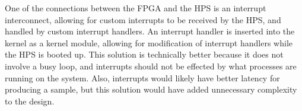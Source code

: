 \documentclass{subfile}
\begin{document}
  One of the connections between the FPGA and the HPS is an interrupt interconnect, 
  allowing for custom interrupts to be received by the HPS, and handled by custom interrupt handlers. 
  An interrupt handler is inserted into the kernel as a kernel module, allowing 
  for modification of interrupt handlers while the HPS is booted up. 
  This solution is technically better because it does not involve a busy loop, 
  and interrupts should not be effected by what processes are running on the system. 
  Also, interrupts would likely have better latency for producing a sample,
  but this solution would have added unnecessary complexity to the design.
\end{document}
